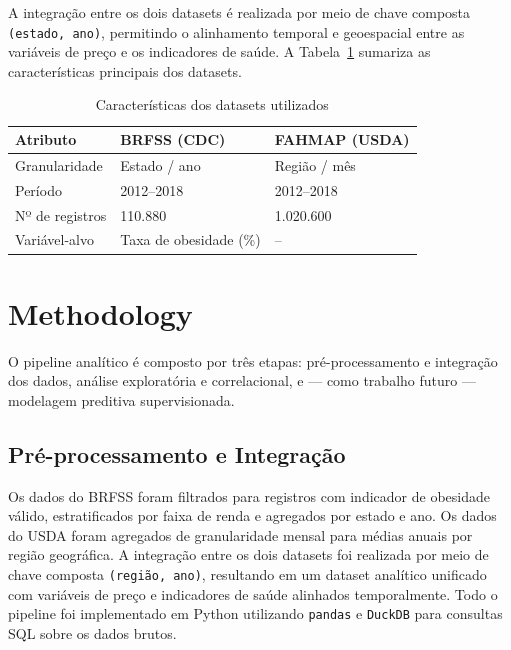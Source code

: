 \documentclass[kdmile,a4paper]{kdmile}
\begin{document}
A integração entre os dois datasets é realizada por meio de chave composta
\texttt{(estado, ano)}, permitindo o alinhamento temporal e geoespacial entre as
variáveis de preço e os indicadores de saúde. A Tabela~\ref{tab:datasets} sumariza as
características principais dos datasets.

\begin{table}[h!]
\caption{Características dos datasets utilizados}
\label{tab:datasets}
\centering
\begin{tabular}{lll}
\toprule
\textbf{Atributo}  & \textbf{BRFSS (CDC)}          & \textbf{FAHMAP (USDA)} \\
\midrule
Granularidade      & Estado / ano                  & Região / mês           \\
Período            & 2012--2018                    & 2012--2018             \\
Nº de registros    & 110.880                       & 1.020.600              \\
Variável-alvo      & Taxa de obesidade (\%)        & --                     \\
\bottomrule
\end{tabular}
\end{table}

\section{Methodology}
\label{sec:method}

O pipeline analítico é composto por três etapas: pré-processamento e integração dos
dados, análise exploratória e correlacional, e — como trabalho futuro — modelagem
preditiva supervisionada.

\subsection{Pré-processamento e Integração}

Os dados do BRFSS foram filtrados para registros com indicador de obesidade válido,
estratificados por faixa de renda e agregados por estado e ano. Os dados do USDA foram
agregados de granularidade mensal para médias anuais por região geográfica. A integração
entre os dois datasets foi realizada por meio de chave composta \texttt{(região, ano)},
resultando em um dataset analítico unificado com variáveis de preço e indicadores de
saúde alinhados temporalmente. Todo o pipeline foi implementado em Python utilizando
\texttt{pandas} e \texttt{DuckDB} para consultas SQL sobre os dados brutos.
\end{document}
